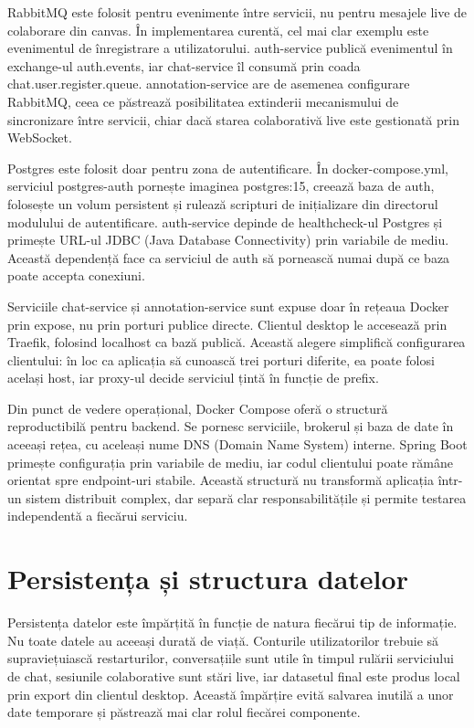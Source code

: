 RabbitMQ este folosit pentru evenimente între servicii, nu pentru mesajele live de colaborare din canvas. În implementarea curentă, cel mai clar exemplu este evenimentul de înregistrare a utilizatorului. auth-service publică evenimentul în exchange-ul auth.events, iar chat-service îl consumă prin coada chat.user.register.queue. annotation-service are de asemenea configurare RabbitMQ, ceea ce păstrează posibilitatea extinderii mecanismului de sincronizare între servicii, chiar dacă starea colaborativă live este gestionată prin WebSocket.

Postgres este folosit doar pentru zona de autentificare. În docker-compose.yml, serviciul postgres-auth pornește imaginea postgres:15, creează baza de auth, folosește un volum persistent și rulează scripturi de inițializare din directorul modulului de autentificare. auth-service depinde de healthcheck-ul Postgres și primește URL-ul JDBC (Java Database Connectivity) prin variabile de mediu. Această dependență face ca serviciul de auth să pornească numai după ce baza poate accepta conexiuni.

Serviciile chat-service și annotation-service sunt expuse doar în rețeaua Docker prin expose, nu prin porturi publice directe. Clientul desktop le accesează prin Traefik, folosind localhost ca bază publică. Această alegere simplifică configurarea clientului: în loc ca aplicația să cunoască trei porturi diferite, ea poate folosi același host, iar proxy-ul decide serviciul țintă în funcție de prefix.

Din punct de vedere operațional, Docker Compose oferă o structură reproductibilă pentru backend. Se pornesc serviciile, brokerul și baza de date în aceeași rețea, cu aceleași nume DNS (Domain Name System) interne. Spring Boot primește configurația prin variabile de mediu, iar codul clientului poate rămâne orientat spre endpoint-uri stabile. Această structură nu transformă aplicația într-un sistem distribuit complex, dar separă clar responsabilitățile și permite testarea independentă a fiecărui serviciu.

\section{Persistența și structura datelor}

Persistența datelor este împărțită în funcție de natura fiecărui tip de informație. Nu toate datele au aceeași durată de viață. Conturile utilizatorilor trebuie să supraviețuiască restarturilor, conversațiile sunt utile în timpul rulării serviciului de chat, sesiunile colaborative sunt stări live, iar datasetul final este produs local prin export din clientul desktop. Această împărțire evită salvarea inutilă a unor date temporare și păstrează mai clar rolul fiecărei componente.

